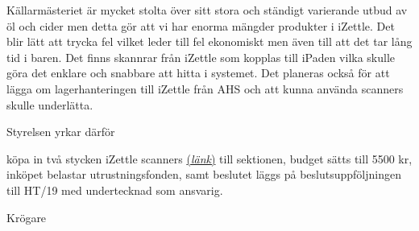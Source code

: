 \documentclass[../_main/handlingar.tex]{subfiles}
\begin{document}

Källarmästeriet är mycket stolta över sitt stora och ständigt varierande utbud av öl 
och cider men detta gör att vi har enorma mängder produkter i iZettle. Det blir lätt att 
trycka fel vilket leder till fel ekonomiskt men även till att det tar lång tid i baren. 
Det finns skannrar från iZettle som kopplas till iPaden vilka skulle göra det enklare och 
snabbare att hitta i systemet. Det planeras också för att lägga om lagerhanteringen till 
iZettle från AHS och att kunna använda scanners skulle underlätta. 



Styrelsen yrkar därför 

\begin{attsatser}
    \att köpa in två stycken iZettle scanners \href{https://tillbehor.izettle.com/streckkodslasare/scanner}{(\textit{länk})} till sektionen,
    \att budget sätts till 5500 kr, 
    \att inköpet belastar utrustningsfonden, samt
    \att beslutet läggs på beslutsuppföljningen till HT/19 med undertecknad som ansvarig.
  
\end{attsatser}

\begin{signatures}{1}
    \ist
    \signature{\krog}{Krögare}
    
\end{signatures}
\end{document}
